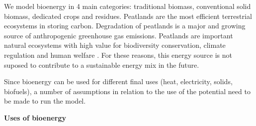 We model bioenergy in 4 main categories: traditional biomass, conventional solid biomass, dedicated crops and residues. Peatlands are the most efficient terrestrial ecosystems in storing carbon. Degradation of peatlands is a major and growing source of anthropogenic greenhouse gas emissions. Peatlands are important natural ecosystems with high value for biodiversity conservation, climate regulation and human welfare \cite{Parish2008}. For these reasons, this energy source is not suposed to contribute to a sustainable energy mix in the future.
 
Since bioenergy can be used for different final uses (heat, electricity, solids, biofuels), a number of assumptions in relation to the use of the potential need to be made to run the model.

\textbf{Uses of bioenergy}


